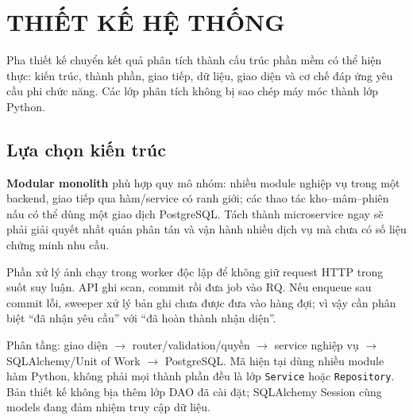 \chapter{THIẾT KẾ HỆ THỐNG}
Pha thiết kế chuyển kết quả phân tích thành cấu trúc phần mềm có thể hiện thực: kiến trúc, thành phần, giao tiếp, dữ liệu, giao diện và cơ chế đáp ứng yêu cầu phi chức năng. Các lớp phân tích không bị sao chép máy móc thành lớp Python.

\section{Lựa chọn kiến trúc}
\textbf{Modular monolith} phù hợp quy mô nhóm: nhiều module nghiệp vụ trong một backend, giao tiếp qua hàm/\allowbreak{}service có ranh giới; các thao tác kho--mâm--phiên nấu có thể dùng một giao dịch PostgreSQL. Tách thành microservice ngay sẽ phải giải quyết nhất quán phân tán và vận hành nhiều dịch vụ mà chưa có số liệu chứng minh nhu cầu.

Phần xử lý ảnh chạy trong worker độc lập để không giữ request HTTP trong suốt suy luận. API ghi scan, commit rồi đưa job vào RQ. Nếu enqueue sau commit lỗi, sweeper xử lý bản ghi chưa được đưa vào hàng đợi; vì vậy cần phân biệt ``đã nhận yêu cầu'' với ``đã hoàn thành nhận diện''.

Phân tầng: giao diện \ensuremath{\rightarrow} router/\allowbreak{}validation/\allowbreak{}quyền \ensuremath{\rightarrow} service nghiệp vụ \ensuremath{\rightarrow} SQLAlchemy/\allowbreak{}Unit of Work \ensuremath{\rightarrow} PostgreSQL. Mã hiện tại dùng nhiều module hàm Python, không phải mọi thành phần đều là lớp {\small\texttt{Service}} hoặc {\small\texttt{Repository}}. Bản thiết kế không bịa thêm lớp DAO đã cài đặt; SQLAlchemy Session cùng models đang đảm nhiệm truy cập dữ liệu.

